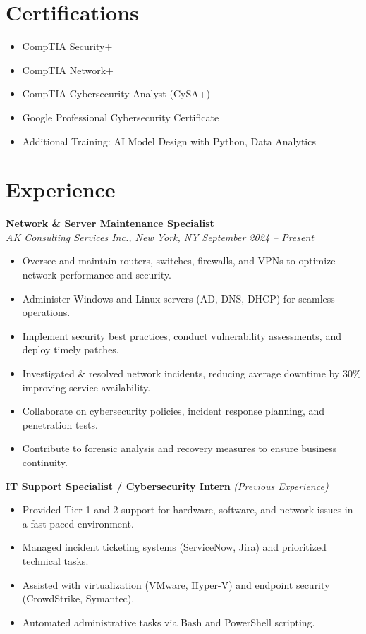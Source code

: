 \documentclass[11pt]{article}
\begin{document}
\section*{Certifications}
\begin{itemize}
    \item CompTIA Security+
    \item CompTIA Network+
    \item CompTIA Cybersecurity Analyst (CySA+)
    \item Google Professional Cybersecurity Certificate
    \item Additional Training: AI Model Design with Python, Data Analytics
\end{itemize}

\section*{Experience}
\textbf{Network \& Server Maintenance Specialist} \\
\textit{AK Consulting Services Inc., New York, NY} \hfill \textit{September 2024 -- Present}

\begin{itemize}
    \item Oversee and maintain routers, switches, firewalls, and VPNs to optimize network performance and security.
    \item Administer Windows and Linux servers (AD, DNS, DHCP) for seamless operations.
    \item Implement security best practices, conduct vulnerability assessments, and deploy timely patches.
    \item Investigated \& resolved network incidents, reducing average downtime by 30\% improving service availability.
    \item Collaborate on cybersecurity policies, incident response planning, and penetration tests.
    \item Contribute to forensic analysis and recovery measures to ensure business continuity.
\end{itemize}

\textbf{IT Support Specialist / Cybersecurity Intern} \hfill \textit{(Previous Experience)}
\begin{itemize}
    \item Provided Tier 1 and 2 support for hardware, software, and network issues in a fast-paced environment.
    \item Managed incident ticketing systems (ServiceNow, Jira) and prioritized technical tasks.
    \item Assisted with virtualization (VMware, Hyper-V) and endpoint security (CrowdStrike, Symantec).
    \item Automated administrative tasks via Bash and PowerShell scripting.
\end{itemize}
\end{document}
